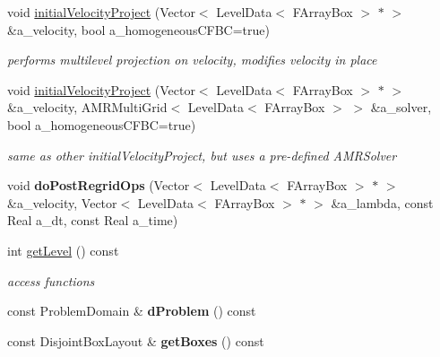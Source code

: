 \begin{DoxyCompactItemize}
\item 
void \hyperlink{class_c_c_projector_comp_a00afa236048520e165f6aa5db8602ad4}{initial\-Velocity\-Project} (Vector$<$ Level\-Data$<$ F\-Array\-Box $>$ $\ast$ $>$ \&a\-\_\-velocity, bool a\-\_\-homogeneous\-C\-F\-B\-C=true)
\begin{DoxyCompactList}\small\item\em performs multilevel projection on velocity, modifies velocity in place \end{DoxyCompactList}\item 
\hypertarget{class_c_c_projector_comp_a268ccd55f18830fcb9328a66ef229059}{void \hyperlink{class_c_c_projector_comp_a268ccd55f18830fcb9328a66ef229059}{initial\-Velocity\-Project} (Vector$<$ Level\-Data$<$ F\-Array\-Box $>$ $\ast$ $>$ \&a\-\_\-velocity, A\-M\-R\-Multi\-Grid$<$ Level\-Data$<$ F\-Array\-Box $>$ $>$ \&a\-\_\-solver, bool a\-\_\-homogeneous\-C\-F\-B\-C=true)}\label{class_c_c_projector_comp_a268ccd55f18830fcb9328a66ef229059}

\begin{DoxyCompactList}\small\item\em same as other initial\-Velocity\-Project, but uses a pre-\/defined A\-M\-R\-Solver \end{DoxyCompactList}\item 
\hypertarget{class_c_c_projector_comp_ab56f8884141ae67311699862aa1cc958}{void {\bfseries do\-Post\-Regrid\-Ops} (Vector$<$ Level\-Data$<$ F\-Array\-Box $>$ $\ast$ $>$ \&a\-\_\-velocity, Vector$<$ Level\-Data$<$ F\-Array\-Box $>$ $\ast$ $>$ \&a\-\_\-lambda, const Real a\-\_\-dt, const Real a\-\_\-time)}\label{class_c_c_projector_comp_ab56f8884141ae67311699862aa1cc958}

\item 
int \hyperlink{class_c_c_projector_comp_ad954f31ddc308c6bf43cd92d01b8a78d}{get\-Level} () const 
\begin{DoxyCompactList}\small\item\em access functions \end{DoxyCompactList}\item 
\hypertarget{class_c_c_projector_comp_a4db95a322f6636ac1fc1f2ca0cea5443}{const Problem\-Domain \& {\bfseries d\-Problem} () const }\label{class_c_c_projector_comp_a4db95a322f6636ac1fc1f2ca0cea5443}

\item 
\hypertarget{class_c_c_projector_comp_ab59c7c16c1d6d0c3e80ea079b0b8fc1a}{const Disjoint\-Box\-Layout \& {\bfseries get\-Boxes} () const }\label{class_c_c_projector_comp_ab59c7c16c1d6d0c3e80ea079b0b8fc1a}


\end{DoxyCompactItemize}
